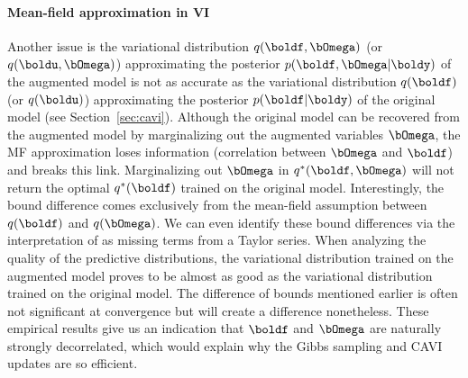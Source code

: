 \paragraph[]{Mean-field approximation in \ac{VI}}\mbox\\
Another issue is the variational distribution $q(\boldf, \bOmega)$ (or $q(\boldu, \bOmega)$) approximating the posterior $p(\boldf, \bOmega|\boldy)$ of the augmented model is not as accurate as the variational distribution $q(\boldf)$ (or $q(\boldu)$) approximating the posterior $p(\boldf|\boldy)$ of the original model (see Section~\ref{sec:cavi}).
Although the original model can be recovered from the augmented model by marginalizing out the augmented variables $\bOmega$, the \ac{MF} approximation loses information (correlation between $\bOmega$ and $\boldf$) and breaks this link.
Marginalizing out $\bOmega$ in $q^*(\boldf, \bOmega)$ will not return the optimal $q^*(\boldf)$ trained on the original model.
Interestingly, the bound difference comes exclusively from the mean-field assumption between $q(\boldf)$ and $q(\bOmega)$.
We can even identify these bound differences via the interpretation of \citet{jaakkolaVariationalApproachBayesian1997} as missing terms from a Taylor series.
When analyzing the quality of the predictive distributions, the variational distribution trained on the augmented model proves to be almost as good as the variational distribution trained on the original model.
The difference of bounds mentioned earlier is often not significant at convergence but will create a difference nonetheless.
These empirical results give us an indication that $\boldf$ and $\bOmega$ are naturally strongly decorrelated, which would explain why the Gibbs sampling and \ac{CAVI} updates are so efficient.




